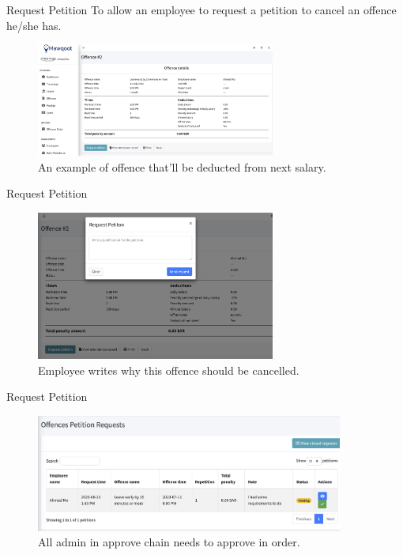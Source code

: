 \documentclass{loyola-beamer}
\begin{document}
\begin{frame}{Request Petition}
	To allow an employee to request a petition to cancel an offence he/she has.

	\begin{figure}
		\begin{center}
			\includegraphics[width=0.7\textwidth]{figures/offence.png}
		\end{center}
		\caption{An example of offence that'll be deducted from next salary.}
	\end{figure}
\end{frame}

\begin{frame}{Request Petition}
	\begin{figure}
		\begin{center}
			\includegraphics[width=0.7\textwidth]{figures/petition-body.png}
		\end{center}
		\caption{Employee writes why this offence should be cancelled.}
	\end{figure}
\end{frame}

\begin{frame}{Request Petition}
	\begin{figure}
		\begin{center}
			\includegraphics[width=0.9\textwidth]{figures/admin-approve.png}
		\end{center}
		\caption{All admin in approve chain needs to approve in order.}
	\end{figure}
\end{frame}
\end{document}
